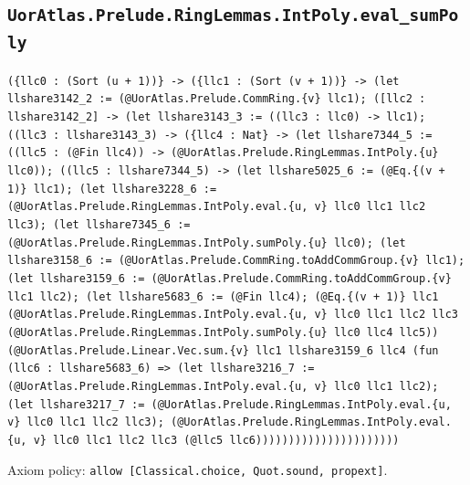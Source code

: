 \documentclass[11pt]{article}
\begin{document}
\subsection*{\texttt{UorAtlas.Prelude.RingLemmas.IntPoly.eval\_sumPoly}}
\noindent\texttt{(\{llc0 : (Sort (u + 1))\} -> (\{llc1 : (Sort (v + 1))\} -> (let llshare3142\_2 := (@UorAtlas.Prelude.CommRing.\{v\} llc1); ([llc2 : llshare3142\_2] -> (let llshare3143\_3 := ((llc3 : llc0) -> llc1); ((llc3 : llshare3143\_3) -> (\{llc4 : Nat\} -> (let llshare7344\_5 := ((llc5 : (@Fin llc4)) -> (@UorAtlas.Prelude.RingLemmas.IntPoly.\{u\} llc0)); ((llc5 : llshare7344\_5) -> (let llshare5025\_6 := (@Eq.\{(v + 1)\} llc1); (let llshare3228\_6 := (@UorAtlas.Prelude.RingLemmas.IntPoly.eval.\{u, v\} llc0 llc1 llc2 llc3); (let llshare7345\_6 := (@UorAtlas.Prelude.RingLemmas.IntPoly.sumPoly.\{u\} llc0); (let llshare3158\_6 := (@UorAtlas.Prelude.CommRing.toAddCommGroup.\{v\} llc1); (let llshare3159\_6 := (@UorAtlas.Prelude.CommRing.toAddCommGroup.\{v\} llc1 llc2); (let llshare5683\_6 := (@Fin llc4); (@Eq.\{(v + 1)\} llc1 (@UorAtlas.Prelude.RingLemmas.IntPoly.eval.\{u, v\} llc0 llc1 llc2 llc3 (@UorAtlas.Prelude.RingLemmas.IntPoly.sumPoly.\{u\} llc0 llc4 llc5)) (@UorAtlas.Prelude.Linear.Vec.sum.\{v\} llc1 llshare3159\_6 llc4 (fun (llc6 : llshare5683\_6) => (let llshare3216\_7 := (@UorAtlas.Prelude.RingLemmas.IntPoly.eval.\{u, v\} llc0 llc1 llc2); (let llshare3217\_7 := (@UorAtlas.Prelude.RingLemmas.IntPoly.eval.\{u, v\} llc0 llc1 llc2 llc3); (@UorAtlas.Prelude.RingLemmas.IntPoly.eval.\{u, v\} llc0 llc1 llc2 llc3 (@llc5 llc6))))))))))))))))))))))}\par
\noindent Axiom policy: \texttt{allow [Classical.choice, Quot.sound, propext]}.\par
\end{document}
